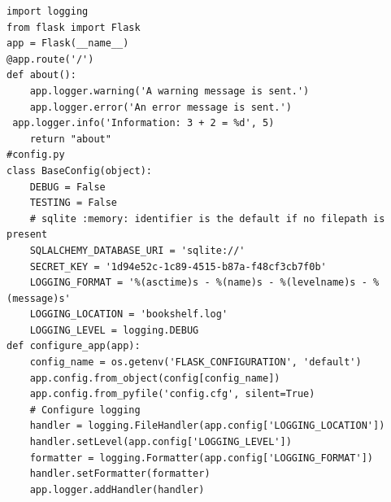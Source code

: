 \begin{verbatim}
import logging
from flask import Flask
app = Flask(__name__)
@app.route('/')
def about():
    app.logger.warning('A warning message is sent.')
    app.logger.error('An error message is sent.')
 app.logger.info('Information: 3 + 2 = %d', 5)
    return "about"
#config.py
class BaseConfig(object):
    DEBUG = False
    TESTING = False
    # sqlite :memory: identifier is the default if no filepath is present
    SQLALCHEMY_DATABASE_URI = 'sqlite://'
    SECRET_KEY = '1d94e52c-1c89-4515-b87a-f48cf3cb7f0b'
    LOGGING_FORMAT = '%(asctime)s - %(name)s - %(levelname)s - %(message)s'
    LOGGING_LOCATION = 'bookshelf.log'
    LOGGING_LEVEL = logging.DEBUG
def configure_app(app):
    config_name = os.getenv('FLASK_CONFIGURATION', 'default')
    app.config.from_object(config[config_name])
    app.config.from_pyfile('config.cfg', silent=True)
    # Configure logging
    handler = logging.FileHandler(app.config['LOGGING_LOCATION'])
    handler.setLevel(app.config['LOGGING_LEVEL'])
    formatter = logging.Formatter(app.config['LOGGING_FORMAT'])
    handler.setFormatter(formatter)
    app.logger.addHandler(handler)
\end{verbatim}
